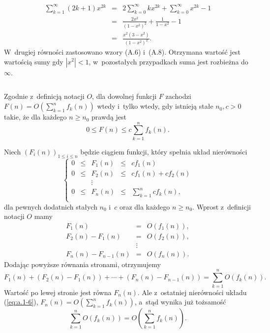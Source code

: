 \subsection{} %
\begin{eqnarray*}
	\sum_{k=1}^\infty(2k+1)x^{2k} &=& 2\sum_{k=0}^\infty kx^{2k}+\sum_{k=0}^\infty x^{2k}-1 \\
	&=& \frac{2x^2}{(1-x^2)^2}+\frac{1}{1-x^2}-1 \\
	&=& \frac{x^2(3-x^2)}{(1-x^2)^2}.
\end{eqnarray*}
W~drugiej równości zastosowano wzory (A.6) i~(A.8). Otrzymana wartość jest wartością sumy gdy $|x^2|<1$, w~pozostałych przypadkach suma jest rozbieżna do $\infty$.

\subsection{} %
Zgodnie z~definicją notacji $O$, dla dowolnej funkcji $F$ zachodzi $F(n) = O\left(\sum_{k=1}^nf_k(n)\right)$ wtedy i~tylko wtedy, gdy istnieją stałe $n_0,c>0$ takie, że dla każdego $n\ge n_0$ prawdą jest
\[
	0\le F(n)\le c\sum_{k=1}^n f_k(n).
\]

Niech $(F_i(n))_{1\le i\le n}$ będzie ciągiem funkcji, który spełnia układ nierówności
\begin{equation}
	\left\{\begin{array}{ccccl}
		0 & \le & F_1(n) & \le & cf_1(n) \\
		0 & \le & F_2(n) & \le & cf_1(n) + cf_2(n) \\
		& & \vdots \\
		0 & \le & F_n(n) & \le & \sum_{k=1}^ncf_k(n), \\
	\end{array}\right. \label{eq:a.1-6}
\end{equation}
dla pewnych dodatnich stałych $n_0$ i~$c$ oraz dla każdego $n\ge n_0$. Wprost z~definicji notacji $O$ mamy
\begin{eqnarray*}
	F_1(n) & = & O(f_1(n)),\\
	F_2(n) - F_1(n) & = & O(f_2(n)),\\
	& \vdots \\
	F_n(n) - F_{n-1}(n) & = & O(f_n(n)).
\end{eqnarray*}
Dodając powyższe równania stronami, otrzymujemy
\[
	F_1(n)+(F_2(n)-F_1(n))+\cdots+(F_n(n)-F_{n-1}(n))=\sum_{k=1}^nO\left(f_k(n)\right).
\]
Wartość po lewej stronie jest równa $F_n(n)$. Ale z~ostatniej nierówności układu (\ref{eq:a.1-6}), $F_n(n) = O\left(\sum_{k=1}^nf_k(n)\right)$, a~stąd wynika już tożsamość
\[
	\sum_{k=1}^nO\left(f_k(n)\right) = O\left(\sum_{k=1}^nf_k(n)\right).
\]

